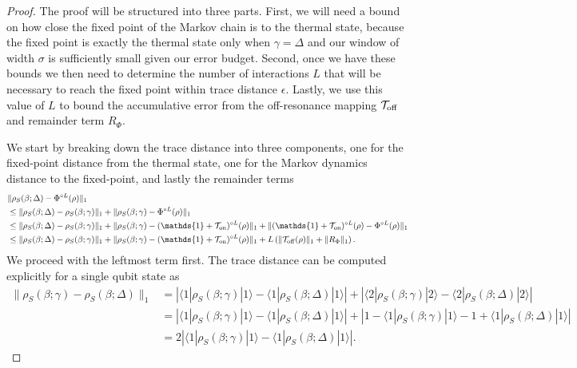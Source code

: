 \documentclass{article}
\newcommand{\on}{\rm on}
\newcommand{\off}{\rm off}
\newcommand{\ket}[1]{|#1\rangle}
\newcommand{\bra}[1]{\langle #1|}
\newcommand{\abs}[1]{\left| #1 \right|}
\newcommand{\norm}[1]{\| #1 \|}
\newcommand{\identity}{\mathds{1}}
\begin{document}
\begin{proof}
    The proof will be structured into three parts. First, we will need a bound on how close the fixed point of the Markov chain is to the thermal state, because  the fixed point  is exactly the thermal state only when $\gamma = \Delta$ and our window of width $\sigma$ is sufficiently small given our error budget. Second, once we have these bounds we then need to determine the number of interactions $L$ that will be necessary to reach the fixed point within trace distance $\epsilon$. Lastly, we use this value of $L$ to bound the accumulative error from the off-resonance mapping $\mathcal{T}_{\off}$ and remainder term $R_{\Phi}$.

    We start by breaking down the trace distance into three components, one for the fixed-point distance from the thermal state, one for the Markov dynamics distance to the fixed-point, and lastly the remainder terms
    \begin{align}
        &\norm{\rho_S(\beta; \Delta) - \Phi^{\circ L}(\rho)}_1 \nonumber \\
        &\le \norm{\rho_S(\beta; \Delta) - \rho_S(\beta; \gamma)}_1 + \norm{\rho_S(\beta; \gamma) - \Phi^{\circ L}(\rho)}_1 \\
        &\le \norm{\rho_S(\beta; \Delta) - \rho_S(\beta; \gamma)}_1 + \norm{\rho_S(\beta; \gamma) - (\identity + \mathcal{T}_{\on})^{\circ L}(\rho)}_1 + \norm{(\identity + \mathcal{T}_{\on})^{\circ L}(\rho) - \Phi^{\circ L}(\rho)}_1 \\
        &\le \norm{\rho_S(\beta; \Delta) - \rho_S(\beta; \gamma)}_1 + \norm{\rho_S(\beta; \gamma) - (\identity + \mathcal{T}_{\on})^{\circ L}(\rho)}_1 +  L \left(\norm{\mathcal{T}_{\off}(\rho)}_1 + \norm{R_{\Phi}}_1 \right). \label{eq:single_qubit_three_errors}
    \end{align}
    We proceed with the leftmost term first. The trace distance can be computed explicitly for a single qubit state as 
 \begin{align}
     \norm{\rho_S(\beta; \gamma) - \rho_S(\beta; \Delta)}_1 &= \abs{\bra{1} \rho_S(\beta; \gamma) \ket{1} - \bra{1}\rho_S(\beta;\Delta)\ket{1}} + \abs{\bra{2} \rho_S(\beta; \gamma) \ket{2} - \bra{2}\rho_S(\beta; \Delta)\ket{2}} \\
     &= \abs{\bra{1} \rho_S(\beta; \gamma) \ket{1} - \bra{1}\rho_S(\beta; \Delta)\ket{1}} + \abs{1 - \bra{1} \rho_S(\beta; \gamma) \ket{1} -1 + \bra{1}\rho_S(\beta; \Delta)\ket{1}} \\
     &= 2 \abs{\bra{1} \rho_S(\beta; \gamma) \ket{1} - \bra{1}\rho_S(\beta; \Delta)\ket{1}}. \label{eq:single_qubit_int_1}

\end{align}
\end{proof}
\end{document}
